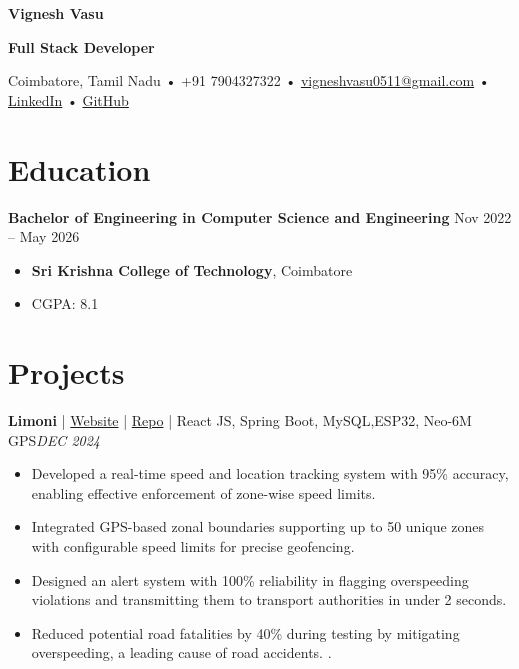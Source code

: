 \documentclass[10pt, letterpaper]{article}
\newenvironment{resumePoints}{
    \begin{itemize}[leftmargin=*,nosep,noitemsep,topsep=2pt,parsep=0pt]
}{\end{itemize}}
\begin{document}
\begin{center}
    \fontsize{14pt}{14pt}\selectfont\textbf{Vignesh Vasu}
    \vspace{0.1cm}
    
    \textbf{\color{primaryColor}Full Stack Developer}
\end{center}

\begin{center}
    \small
    Coimbatore, Tamil Nadu • +91 7904327322 • \href{mailto:vigneshvasu0511@gmail.com}{vigneshvasu0511@gmail.com} • \href{https://linkedin.com/in/vignesh2004vasu}{LinkedIn} • \href{https://github.com/vignesh2004vasu}{GitHub}
\end{center}

\vspace{-0.2cm}

\section{Education}
\vspace{-0.2cm}

\textbf{Bachelor of Engineering in Computer Science and Engineering} \hfill Nov 2022 – May 2026
\begin{resumePoints}
    \item \textbf{Sri Krishna College of Technology}, Coimbatore
    \item CGPA: 8.1
\end{resumePoints}
\vspace{-0.2cm}

\section{Projects}
\vspace{-0.2cm}

\textbf{Limoni} | \href{https://limoni-nerddev.netlify.app}{Website} | \href{https://github.com/vignesh2004vasu}{Repo} | React JS, Spring Boot, MySQL,ESP32, Neo-6M GPS\hfill \textit{DEC 2024}
\begin{resumePoints}
     \item Developed a real-time speed and location tracking system with 95\% accuracy, enabling effective enforcement of zone-wise speed limits.  
  \item Integrated GPS-based zonal boundaries supporting up to 50 unique zones with configurable speed limits for precise geofencing.  
  \item Designed an alert system with 100\% reliability in flagging overspeeding violations and transmitting them to transport authorities in under 2 seconds.  
  \item Reduced potential road fatalities by 40\% during testing by mitigating overspeeding, a leading cause of road accidents.  .  
\end{resumePoints}
\end{document}
